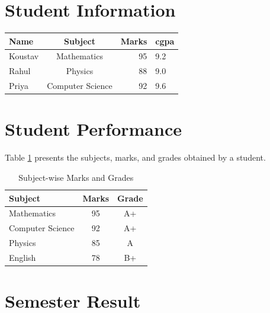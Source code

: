 \documentclass{article}
\begin{document}
	
	\section{Student Information}
		\begin{tabular}{|l|c|r|l|}
			\hline
			Name & Subject & Marks&cgpa \\
			\hline
			Koustav & Mathematics & 95&9.2 \\
			\hline
			Rahul & Physics & 88 &9.0 \\
			\hline
			Priya & Computer Science & 92&9.6 \\
			\hline
		\end{tabular}
		\section{Student Performance}
		
		Table \ref{tab:marks} presents the subjects, marks, and grades
		obtained by a student.
		
		\begin{table}[h]
			\centering
			
			\caption{Subject-wise Marks and Grades}
			\label{tab:marks}
			
			\begin{tabular}{lcc}
				\toprule
				Subject & Marks & Grade \\
				\midrule
				Mathematics & 95 & A+ \\
				Computer Science & 92 & A+ \\
				Physics & 85 & A \\
				English & 78 & B+ \\
				\bottomrule
			\end{tabular}
			
		\end{table}

		\section{Semester Result}
		
\end{document}
